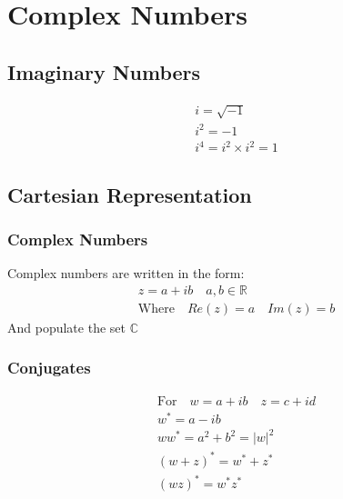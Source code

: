 \documentclass[../main]{subfiles}
\begin{document}
\section{Complex Numbers}

\subsection{Imaginary Numbers}
	\begin{equation*} \begin{gathered}
		i = \sqrt{-1} \\
		i^2 = -1 \\
		i^4 = i^2 \times i^2 = 1
	\end{gathered} \end{equation*}

\subsection{Cartesian Representation}

	\subsubsection{Complex Numbers}
	Complex numbers are written in the form:
	\begin{equation*} \begin{gathered}
		z = a + ib \quad a,b \in \mathbb{R} \\
		\text{Where} \quad Re(z) = a \quad Im(z) = b
	\end{gathered} \end{equation*}
	And populate the set \(\mathbb{C}\)
	\subsubsection{Conjugates}
	\begin{equation*} \begin{gathered}
		\text{For} \quad w = a+ib \quad z = c+id \\
		w^* = a - ib \\
		ww^* = a^2 + b^2 = |w|^2\\
		(w+z)^* = w^* + z^* \\
		(wz)^* = w^*z^* \\
	\end{gathered} \end{equation*}
\end{document}

